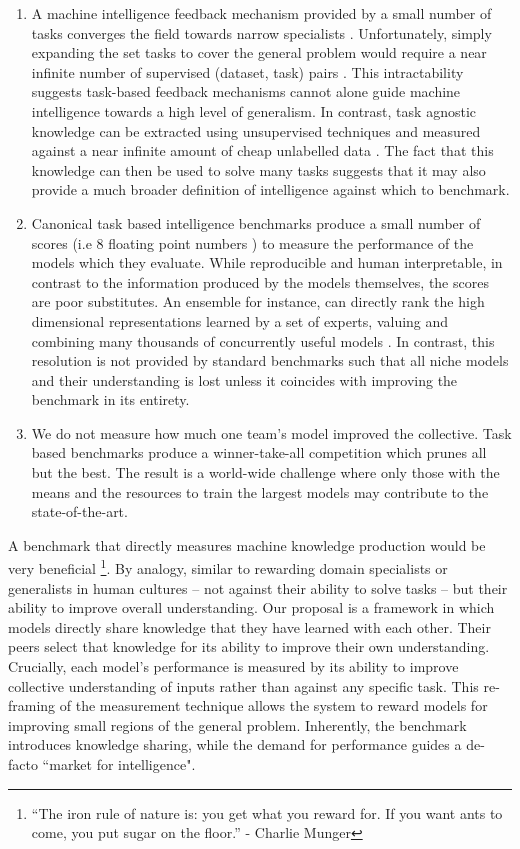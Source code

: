 \documentclass{article}
\begin{document}
\begin{enumerate}
	\item A machine intelligence feedback mechanism provided by a small number of tasks converges the field towards  narrow specialists \cite{chollet2019measure}. Unfortunately, simply expanding the set tasks to cover the general problem would require a near infinite number of supervised (dataset, task) pairs \cite{radford2019language}. This intractability suggests task-based feedback mechanisms cannot alone guide machine intelligence towards a high level of generalism. In contrast, task agnostic knowledge can be extracted using unsupervised techniques and measured against a near infinite amount of cheap unlabelled data \cite{devlin2018bert}. The fact that this knowledge can then be used to solve many tasks \cite{radford2019language} suggests that it may also provide a much broader definition of intelligence against which to benchmark. 
	
	\item Canonical task based intelligence benchmarks produce a small number of scores (i.e 8 floating point numbers \cite{wang2019superglue}) to measure the performance of the models which they evaluate. While reproducible and human interpretable, in contrast to the information produced by the models themselves, the scores are poor substitutes. An ensemble for instance, can directly rank the high dimensional representations learned by a set of experts, valuing and combining many thousands of concurrently useful models \cite{shazeer2017outrageously}. In contrast, this resolution is not provided by standard benchmarks such that all niche models and their understanding is lost unless it coincides with improving the benchmark in its entirety.
	
	\item We do not measure how much one team's model improved the collective. Task based benchmarks produce a winner-take-all competition which prunes all but the best. The result is a world-wide challenge where only those with the means and the resources to train the largest models may contribute to the state-of-the-art.
\end{enumerate}


A benchmark that directly measures machine knowledge production would be very beneficial  \footnote{“The iron rule of nature is: you get what you reward for. If you want ants to come, you put sugar on the floor.” - Charlie Munger}. By analogy, similar to rewarding domain specialists or generalists in human cultures -- not against their ability to solve tasks -- but their ability to improve overall understanding. Our proposal is a framework in which models directly share knowledge that they have learned with each other. Their peers select that knowledge for its ability to improve their own understanding. Crucially, each model's performance is measured by its ability to improve collective understanding of inputs rather than against any specific task. {\color{red} This re-framing of the measurement technique allows the system to reward models for improving small regions of the general problem. Inherently, the benchmark introduces knowledge sharing, while the demand for performance guides a de-facto ``market for intelligence".   }
\end{document}
